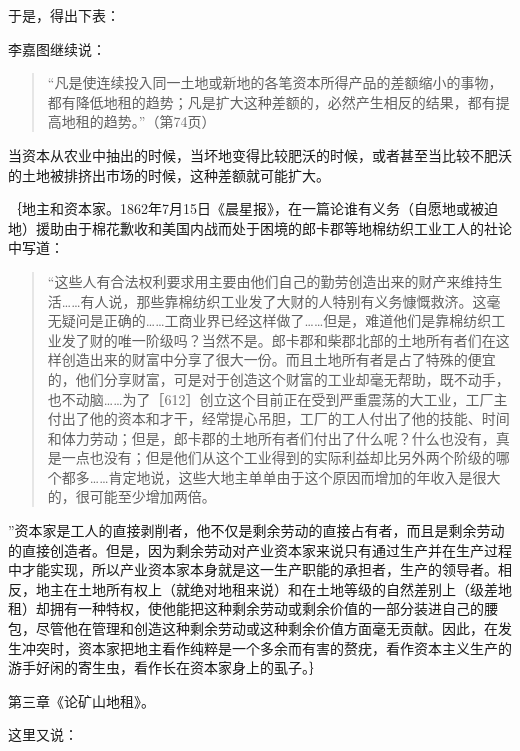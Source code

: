 于是，得出下表：

\todo{}

李嘉图继续说：

\begin{quote}“凡是使连续投入同一土地或新地的各笔资本所得产品的差额缩小的事物，都有降低地租的趋势；凡是扩大这种差额的，必然产生相反的结果，都有提高地租的趋势。”（第74页）\end{quote}

当资本从农业中抽出的时候，当坏地变得比较肥沃的时候，或者甚至当比较不肥沃的土地被排挤出市场的时候，这种差额就可能扩大。

｛地主和资本家。1862年7月15日《晨星报》，在一篇论谁有义务（自愿地或被迫地）援助由于棉花歉收和美国内战而处于困境的郎卡郡等地棉纺织工业工人的社论中写道：

\todo{}

\begin{quote}“这些人有合法权利要求用主要由他们自己的勤劳创造出来的财产来维持生活……有人说，那些靠棉纺织工业发了大财的人特别有义务慷慨救济。这毫无疑问是正确的……工商业界已经这样做了……但是，难道他们是靠棉纺织工业发了财的唯一阶级吗？当然不是。郎卡郡和柴郡北部的土地所有者们在这样创造出来的财富中分享了很大一份。而且土地所有者是占了特殊的便宜的，他们分享财富，可是对于创造这个财富的工业却毫无帮助，既不动手，也不动脑……为了［612］创立这个目前正在受到严重震荡的大工业，工厂主付出了他的资本和才干，经常提心吊胆，工厂的工人付出了他的技能、时间和体力劳动；但是，郎卡郡的土地所有者们付出了什么呢？什么也没有，真是一点也没有；但是他们从这个工业得到的实际利益却比另外两个阶级的哪个都多……肯定地说，这些大地主单单由于这个原因而增加的年收入是很大的，很可能至少增加两倍。\end{quote}

”资本家是工人的直接剥削者，他不仅是剩余劳动的直接占有者，而且是剩余劳动的直接创造者。但是，因为剩余劳动对产业资本家来说只有通过生产并在生产过程中才能实现，所以产业资本家本身就是这一生产职能的承担者，生产的领导者。相反，地主在土地所有权上（就绝对地租来说）和在土地等级的自然差别上（级差地租）却拥有一种特权，使他能把这种剩余劳动或剩余价值的一部分装进自己的腰包，尽管他在管理和创造这种剩余劳动或这种剩余价值方面毫无贡献。因此，在发生冲突时，资本家把地主看作纯粹是一个多余而有害的赘疣，看作资本主义生产的游手好闲的寄生虫，看作长在资本家身上的虱子。｝

第三章《论矿山地租》。

这里又说：



